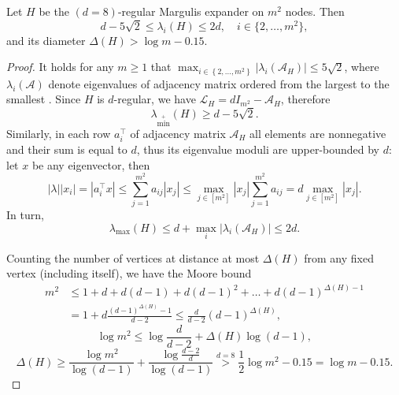 \documentclass[a4paper,USenglish,cleveref, autoref, thm-restate]{lipics-v2021}
\newcommand{\cA}{{\mathcal A}}
\newcommand{\cL}{{\mathcal L}}
\newcommand{\cbr}[1]{\left(#1\right)}
\newcommand{\br}[1]{\left\{#1\right\}}
\newcommand{\lmax}{\lambda_{\max}}
\newcommand{\lminp}{\lambda_{\min^+}}
\begin{document}
\begin{claim}\label{clm:margulis}
  Let $H$ be the $(d=8)$-regular Margulis expander on $m^2$ nodes. 
  Then
  \begin{equation}
    d - 5\sqrt 2 \leq \lambda_i(H) \leq 2d, \quad i \in \{2, \ldots, m^2\},
  \end{equation}
  and its diameter
  $\Delta(H) > \log m - 0.15$.
\end{claim}
\begin{proof}
  It holds for any $m \geq 1$ that $\max_{i \in \br{2,\ldots,m^2}}|\lambda_i(\cA_H)| \leq 5 \sqrt{2}$, where $\lambda_i(\cA)$ denote eigenvalues of adjacency matrix ordered from the largest to the smallest \cite[Theorem~8.2]{hoory2006expander}.
  Since $H$ is $d$-regular, we have $\cL_H = dI_{m^2} - \cA_H$, therefore
  \begin{equation}
    \lminp(H) \geq d - 5 \sqrt{2}.
  \end{equation}
  Similarly, in each row $a_i^\top$ of adjacency matrix $\cA_H$ all elements are nonnegative and their sum is equal to $d$, thus its eigenvalue moduli are upper-bounded by $d$: let $x$ be any eigenvector, then
  \begin{equation}
  |\lambda| |x_i| = |a_i^\top x| \leq \sum_{j=1}^{m^2} a_{ij}|x_j| \leq \max_{j \in [m^2]} |x_j| \sum_{j=1}^{m^2} a_{ij} = d\max_{j \in [m^2]} |x_j|.
  \end{equation}
  In turn,
  \begin{equation}
    \lmax(H) \leq d + \max_i |\lambda_i(\cA_H)|\leq 2 d.
  \end{equation}

  Counting the number of vertices at distance at most $\Delta(H)$ from any fixed vertex (including itself), we have the Moore bound
  \begin{equation*}
  \begin{aligned}
    m^2 &\leq 1 + d + d(d-1) + d(d-1)^2 + \ldots + d (d-1)^{\Delta(H)-1} 
    \\&= 1 + d \frac{(d-1)^{\Delta(H)}-1}{d-2}\leq \frac{d}{d-2}(d-1)^{\Delta(H)},
  \end{aligned}
  \end{equation*}
  \begin{equation*}
    \log{m^2} \leq \log{\frac{d}{d-2}} + \Delta(H)\log\cbr{d-1},
  \end{equation*}
  \begin{equation}\label{eq:diam_H_n}
    \Delta(H) \geq \frac{\log{m^2}}{\log\cbr{d-1}} + \frac{\log{\frac{d-2}{d}}}{\log\cbr{d-1}}  \stackrel{d = 8}{>} \frac12 \log m^2 - 0.15 = \log m - 0.15.
  \end{equation}
\end{proof}
\end{document}
